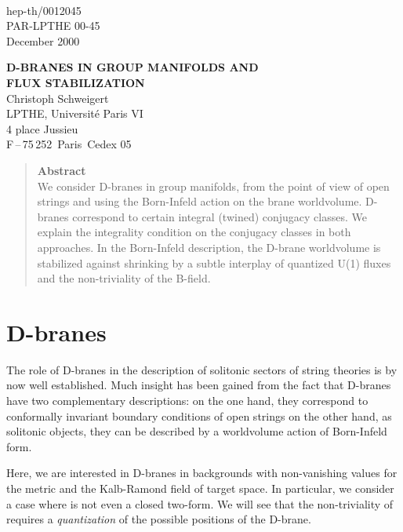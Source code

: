 \documentclass[a4paper,12pt]{article} \usepackage{amssymb,amsfonts,latexsym}
\begin{document}
\begin{flushright}  {~} \\[-1cm]
{\sf hep-th/0012045}\\{\sf PAR-LPTHE 00-45}\\[1mm]
{\sf December 2000} \end{flushright}

\begin{center} \vskip 14mm
{\Large\bf D-BRANES IN GROUP MANIFOLDS AND} \\[4mm]
{\Large\bf FLUX STABILIZATION}\\[20mm]
{\large Christoph Schweigert}
\\[8mm]
LPTHE, Universit\'e Paris VI~~~{}\\
4 place Jussieu\\ F\,--\,75\,252\, Paris\, Cedex 05
\end{center}
\vskip 18mm
\begin{quote}{\bf Abstract}\\[1mm]
We consider D-branes in group manifolds, from the point of view
of open strings and using the Born-Infeld action on the brane
worldvolume. D-branes correspond to certain integral (twined) conjugacy 
classes. We explain the integrality condition on the conjugacy classes
in both approaches. In the Born-Infeld description, the D-brane worldvolume
is stabilized against shrinking by a subtle interplay of quantized U(1) fluxes
and the non-triviality of the B-field.
\end{quote}

\bigskip


\section{D-branes}

The role of D-branes in the description of solitonic sectors of string
theories is by now well established. Much insight has been gained from
the fact that D-branes have two complementary descriptions:
\nxt on the one hand, they correspond to conformally invariant
     boundary conditions of open strings
\nxt on the other hand, as solitonic objects, they can be described
     by a worldvolume action of Born-Infeld form.

Here, we are interested in D-branes in backgrounds with non-vanishing
values for the metric \coordHE{} and the Kalb-Ramond field \coordHE{} of
target space. In particular, we consider a case where \coordHE{} is not
even a closed two-form. We will see that the non-triviality of \coordHE{} 
requires a {\em quantization} of the possible positions of the D-brane.
\end{document}
